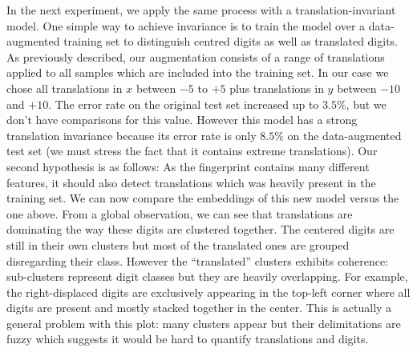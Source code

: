 \documentclass[a4paper,12pt]{report}
\begin{document}
In the next experiment, we apply the same process with a translation-invariant model.
One simple way to achieve invariance is to train the model over a data-augmented training set to distinguish centred digits as well as translated digits.
As previously described, our augmentation consists of a range of translations applied to all samples which are included into the training set.
In our case we chose all translations in $x$ between $-5$ to $+5$ plus translations in $y$ between $-10$ and $+10$.
The error rate on the original test set increased up to $3.5\%$, but we don't have comparisons for this value.
However this model has a strong translation invariance because its error rate is only $8.5\%$ on the data-augmented test set (we must stress the fact that it contains extreme translations).
Our second hypothesis is as follows: As the fingerprint contains many different features, it should also detect translations which was heavily present in the training set.
We can now compare the embeddings of this new model versus the one above.
From a global observation, we can see that translations are dominating the way these digits are clustered together.
The centered digits are still in their own clusters but most of the translated ones are grouped disregarding their class.
However the ``translated'' clusters exhibits coherence: sub-clusters represent digit classes but they are heavily overlapping.
For example, the right-displaced digits are exclusively appearing in the top-left corner where all digits are present and mostly stacked together in the center.
This is actually a general problem with this plot: many clusters appear but their delimitations are fuzzy which suggests it would be hard to quantify translations and digits.
\end{document}
